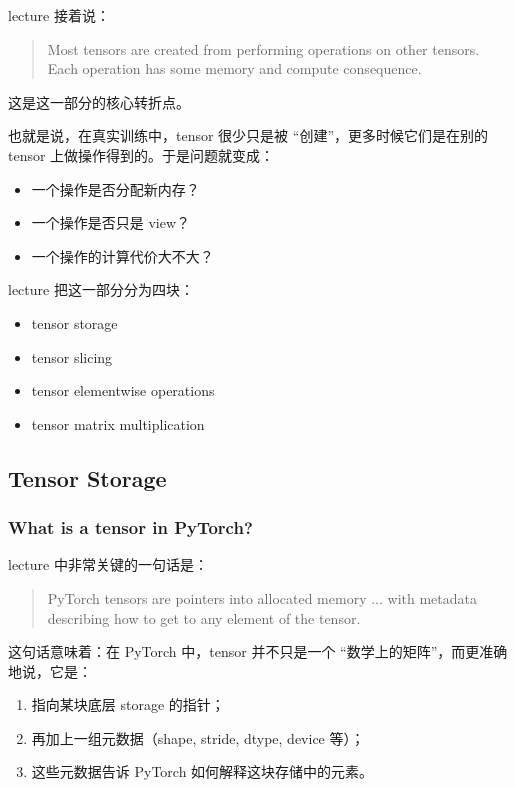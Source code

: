 \documentclass[a4paper,UTF8]{article}
\numberwithin{equation}{section}
\begin{document}
lecture 接着说：
\begin{quote}
Most tensors are created from performing operations on other tensors. \\
Each operation has some memory and compute consequence.
\end{quote}

这是这一部分的核心转折点。

也就是说，在真实训练中，tensor 很少只是被 ``创建''，更多时候它们是在别的 tensor 上做操作得到的。于是问题就变成：
\begin{itemize}
    \item 一个操作是否分配新内存？
    \item 一个操作是否只是 view？
    \item 一个操作的计算代价大不大？
\end{itemize}

lecture 把这一部分分为四块：
\begin{itemize}
    \item tensor storage
    \item tensor slicing
    \item tensor elementwise operations
    \item tensor matrix multiplication
\end{itemize}

\subsection{Tensor Storage}

\subsubsection{What is a tensor in PyTorch?}

lecture 中非常关键的一句话是：
\begin{quote}
PyTorch tensors are pointers into allocated memory ... with metadata describing how to get to any element of the tensor.
\end{quote}

这句话意味着：在 PyTorch 中，tensor 并不只是一个 ``数学上的矩阵''，而更准确地说，它是：
\begin{enumerate}
    \item 指向某块底层 storage 的指针；
    \item 再加上一组元数据（shape, stride, dtype, device 等）；
    \item 这些元数据告诉 PyTorch 如何解释这块存储中的元素。
\end{enumerate}
\end{document}

